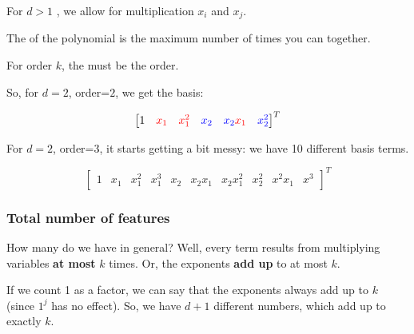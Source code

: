                 \begin{definition}
                    For  $d>1$ , we allow for multiplication  $x_i$ and $x_j$.

                    The  of the polynomial is the maximum number of times you can  together. 
                    
                    For order $k$, the  must be  the order.
                \end{definition}

                So, for $d=2$, order=$2$, we get the basis:

                \begin{equation}
                    \begin{bmatrix}
                        1 & \textcolor{red}{x_1} & \textcolor{red}{x_1^2} & \textcolor{blue}{x_2} & \textcolor{blue}{x_2}\textcolor{red}{x_1} & \textcolor{blue}{x_2^2}
                    \end{bmatrix}^T
                \end{equation}

                For $d=2$, order=$3$, it starts getting a bit messy: we have 10 different basis terms.

                \begin{equation}
                    \begin{bmatrix}
                        1 & x_1 & x_1^2 & x_1^3 &
                        x_2 & x_2x_1 & x_2x_1^2 & x_2^2 &
                        x^2x_1 & x^3
                    \end{bmatrix}^T
                \end{equation}

            \subsecdiv
            \subsubsection{Total number of features}
        
                How many do we have in general? Well, every term results from multiplying variables \textbf{at most} $k$ times. Or, the exponents \textbf{add up} to at most $k$.
                
                If we count 1 as a factor, we can say that the exponents always add up to $k$ (since $1^j$ has no effect). So, we have $d+1$ different numbers, which add up to exactly $k$.

